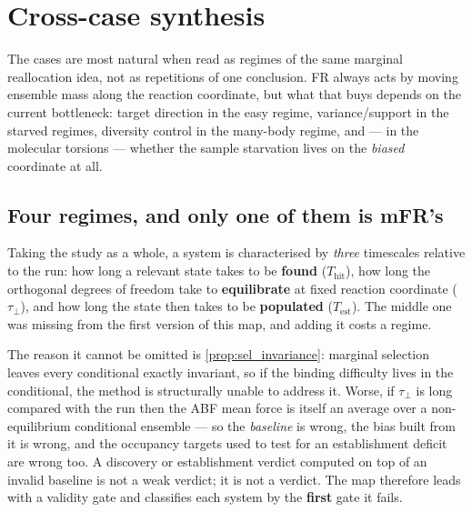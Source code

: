 \section{Cross-case synthesis}
\label{sec:synthesis}

The cases are most natural when read as regimes of the same marginal
reallocation idea, not as repetitions of one conclusion. FR always acts by moving
ensemble mass along the reaction coordinate, but what that buys depends on the
current bottleneck: target direction in the easy regime, variance/support in the
starved regimes, diversity control in the many-body regime, and --- in the molecular
torsions --- whether the sample starvation lives on the \emph{biased} coordinate at
all.

\subsection{Four regimes, and only one of them is mFR's}
\label{sec:three_regimes}
Taking the study as a whole, a system is characterised by \emph{three} timescales relative to
the run: how long a relevant state takes to be \textbf{found} ($T_{\mathrm{hit}}$), how long
the orthogonal degrees of freedom take to \textbf{equilibrate} at fixed reaction coordinate
($\tau_\perp$), and how long the state then takes to be \textbf{populated}
($T_{\mathrm{est}}$). The middle one was missing from the first version of this map, and
adding it costs a regime.

The reason it cannot be omitted is \cref{prop:sel_invariance}: marginal selection leaves
every conditional exactly invariant, so if the binding difficulty lives in the conditional,
the method is structurally unable to address it. Worse, if $\tau_\perp$ is long compared with
the run then the ABF mean force is itself an average over a non-equilibrium conditional
ensemble --- so the \emph{baseline} is wrong, the bias built from it is wrong, and the
occupancy targets used to test for an establishment deficit are wrong too. A discovery or
establishment verdict computed on top of an invalid baseline is not a weak verdict; it is not
a verdict. The map therefore leads with a validity gate and classifies each system by the
\textbf{first} gate it fails.

